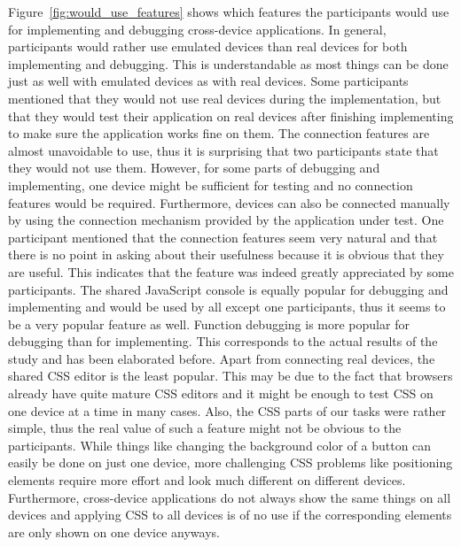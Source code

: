 Figure~\ref{fig:would_use_features} shows which features the participants would use for implementing and debugging cross-device applications. In general, participants would rather use emulated devices than real devices for both implementing and debugging. This is understandable as most things can be done just as well with emulated devices as with real devices. Some participants mentioned that they would not use real devices during the implementation, but that they would test their application on real devices after finishing implementing to make sure the application works fine on them. The connection features are almost unavoidable to use, thus it is surprising that two participants state that they would not use them. However, for some parts of debugging and implementing, one device might be sufficient for testing and no connection features would be required. Furthermore, devices can also be connected manually by using the connection mechanism provided by the application under test. One participant mentioned that the connection features seem very natural and that there is no point in asking about their usefulness because it is obvious that they are useful. This indicates that the feature was indeed greatly appreciated by some participants. The shared JavaScript console is equally popular for debugging and implementing and would be used by all except one participants, thus it seems to be a very popular feature as well. Function debugging is more popular for debugging than for implementing. This corresponds to the actual results of the study and has been elaborated before. Apart from connecting real devices, the shared CSS editor is the least popular. This may be due to the fact that browsers already have quite mature CSS editors and it might be enough to test CSS on one device at a time in many cases. Also, the CSS parts of our tasks were rather simple, thus the real value of such a feature might not be obvious to the participants. While things like changing the background color of a button can easily be done on just one device, more challenging CSS problems like positioning elements require more effort and look much different on different devices. Furthermore, cross-device applications do not always show the same things on all devices and applying CSS to all devices is of no use if the corresponding elements are only shown on one device anyways.

